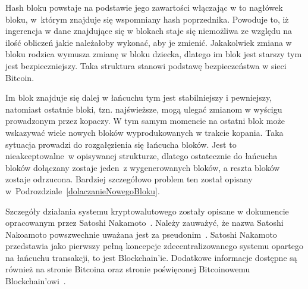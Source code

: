 \documentclass[12pt, oneside, final, openany]{mgr}
\begin{document}
\indent Hash bloku powstaje na podstawie jego zawartości włączając w to nagłówek bloku, w~którym znajduje się wspomniany hash poprzednika. Powoduje to, iż ingerencja w dane znajdujące się w blokach staje się niemożliwa ze względu na ilość obliczeń jakie należałoby wykonać, aby je zmienić. Jakakolwiek zmiana w bloku rodzica wymusza zmianę w bloku dziecka, dlatego im blok jest starszy tym jest bezpieczniejszy. Taka struktura stanowi podstawę bezpieczeństwa w sieci Bitcoin.

\indent Im blok znajduje się dalej w łańcuchu tym jest stabilniejszy i pewniejszy, natomiast ostatnie bloki, tzn. najświeższe, mogą ulegać zmianom w wyścigu prowadzonym przez kopaczy. W tym samym momencie na ostatni blok może wskazywać wiele nowych bloków wyprodukowanych w trakcie kopania. Taka sytuacja prowadzi do rozgałęzienia się łańcucha bloków. Jest to nieakceptowalne~w opisywanej strukturze, dlatego ostatecznie do łańcucha bloków dołączany zostaje jeden~z wygenerowanych bloków, a reszta bloków zostaje odrzucona. Bardziej szczegółowo problem ten został opisany w~Podrozdziale~\ref{dolaczanieNowegoBloku}.

\indent Szczegóły działania systemu kryptowalutowego zostały opisane w dokumencie opracowanym przez Satoshi Nakamoto~\cite{nakamoto2008bitcoin}. Należy zauważyć, że nazwa Satoshi Nakoamoto powszwechnie uważana jest za pseudonim~\cite{satoshi}. Satoshi Nakamoto przedstawia jako pierwszy pełną koncepcje zdecentralizowanego  systemu opartego na łańcuchu transakcji, to jest Blockchain'ie. Dodatkowe informacje dostępne są również na stronie Bitcoina oraz stronie poświęconej Bitcoinowemu Blockchain'owi~\cite{blockchaininfo, bitcoinorg}.
\end{document}
